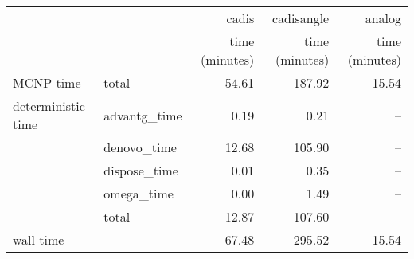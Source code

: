 \begin{tabular}{llrrr}
\toprule
          &              &          cadis &     cadisangle &         analog \\
          &              & time (minutes) & time (minutes) & time (minutes) \\
\midrule
MCNP time & total &          54.61 &         187.92 &          15.54 \\
deterministic time & advantg\_time &           0.19 &           0.21 &            -- \\
          & denovo\_time &          12.68 &         105.90 &            -- \\
          & dispose\_time &           0.01 &           0.35 &            -- \\
          & omega\_time &           0.00 &           1.49 &            -- \\
          & total &          12.87 &         107.60 &            -- \\
wall time &              &          67.48 &         295.52 &          15.54 \\
\bottomrule
\end{tabular}
